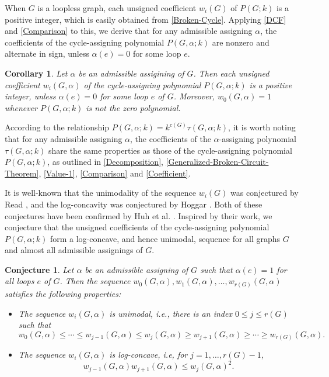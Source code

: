 \documentclass[12pt]{article}%
\numberwithin{equation}{section}
\newtheorem{conjecture}[conjecture]{Conjecture}
\newtheorem{corollary}[corollary]{Corollary}
\begin{document}
When $G$ is a loopless graph, each unsigned coefficient $w_i(G)$ of $P(G;k)$ is a positive integer, which is easily obtained from \autoref{Broken-Cycle}. Applying \autoref{DCF} and \autoref{Comparison} to this, we derive that for any admissible assigning $\alpha$,  the coefficients of the cycle-assigning polynomial $P(G,\alpha; k)$ are nonzero and alternate in sign, unless $\alpha(e)=0$ for some loop $e$.
\begin{corollary}\label{Coefficient}
Let $\alpha$ be an admissible assigining of $G$. Then each unsigned coefficient $w_i(G,\alpha)$ of the cycle-assigning polynomial $P(G,\alpha;k)$ is a positive integer, unless $\alpha(e)=0$ for some loop $e$ of $G$. Moreover, $w_0(G,\alpha)=1$ whenever $P(G,\alpha;k)$ is not the zero polynomial.
\end{corollary}

According to the relationship $P(G,\alpha;k)=k^{c(G)}\tau(G,\alpha;k)$, it is worth noting that for any admissible assigning $\alpha$, the coefficients of the $\alpha$-assigning polynomial $\tau(G,\alpha;k)$ share the same properties as those of the cycle-assigning polynomial $P(G,\alpha;k)$, as outlined in \autoref{Decomposition}, \autoref{Generalized-Broken-Circuit-Theorem}, \autoref{Value-1}, \autoref{Comparison} and \autoref{Coefficient}.

It is well-known that the unimodality of the sequence $w_i(G)$ was conjectured by Read \cite{Read1968}, and the log-concavity was conjectured by Hoggar \cite{Hoggar1974}. Both of these conjectures have been confirmed by Huh et al. \cite{AHE2018,Huh2012,Huh-Katz2012}. Inspired by their work, we conjecture that the unsigned coefficients of the cycle-assigning polynomial $P(G,\alpha;k)$ form a log-concave, and hence unimodal, sequence for all graphs $G$ and almost all admissible assignings of $G$.
\begin{conjecture}\label{Conj}
Let $\alpha$ be an admissible assigning of $G$ such that $\alpha(e)=1$ for all loops $e$ of $G$. Then the sequence $w_0(G,\alpha),w_1(G,\alpha),\ldots,w_{r(G)}(G,\alpha)$ satisfies the following properties:
\begin{itemize}
\item The sequence $w_i(G,\alpha)$ is unimodal, i.e., there is an index $0\le j\le r(G)$ such that 
\[
w_0(G,\alpha)\le\cdots\le w_{j-1}(G,\alpha)\le w_j(G,\alpha)\ge w_{j+1}(G,\alpha)\ge\cdots\ge w_{r(G)}(G,\alpha).
\]
\item The sequence $w_i(G,\alpha)$ is log-concave, i.e, for $j=1,\ldots, r(G)-1$,
 \[
w_{j-1}(G,\alpha)w_{j+1}(G,\alpha)\le  w_j(G,\alpha)^2.
 \]
\end{itemize}
\end{conjecture}
\end{document}
